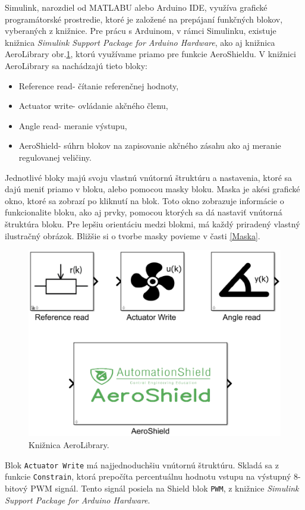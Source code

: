 Simulink, narozdiel od MATLABU alebo Arduino IDE, využíva grafické programátorské prostredie, ktoré je založené na prepájaní funkčných blokov, vyberaných z knižnice. Pre prácu s Arduinom, v rámci Simulinku, existuje knižnica \textit{Simulink Support Package for Arduino Hardware}, ako aj knižnica AeroLibrary obr.\ref{OBRAZOK 2.6.4}, ktorú využívame priamo pre funkcie AeroShieldu. V knižnici AeroLibrary sa nachádzajú tieto bloky: 
\begin{itemize}
	\item Reference read- čítanie referenčnej hodnoty, 
	\item Actuator write- ovládanie akčného členu, 
	\item Angle read- meranie výstupu, 
	\item AeroShield- súhrn blokov na zapisovanie akčného zásahu ako aj meranie regulovanej veličiny.
\end{itemize}
Jednotlivé bloky majú svoju vlastnú vnútornú štruktúru a nastavenia, ktoré sa dajú meniť priamo v bloku, alebo pomocou masky bloku. Maska je akési grafické okno, ktoré sa zobrazí po kliknutí na blok. Toto okno zobrazuje informácie o funkcionalite bloku, ako aj prvky, pomocou ktorých sa dá nastaviť vnútorná štruktúra bloku. Pre lepšiu orientáciu medzi blokmi, má každý priradený vlastný ilustračný obrázok. Bližšie si o tvorbe masky povieme v časti \ref{Maska}. 

\begin{figure}[!tbh]
	\centering
	\includegraphics[width=125mm]{obr/AeroLib.png}
	\caption{Knižnica AeroLibrary.}\label{OBRAZOK 2.6.4}
\end{figure}

Blok \verb|Actuator Write| má najjednoduchšiu vnútornú štruktúru. Skladá sa z funkcie \verb*|Constrain|, ktorá prepočíta percentuálnu hodnotu vstupu na výstupný 8-bitový PWM signál. Tento signál posiela na Shield blok \verb*|PWM|, z knižnice \textit{Simulink Support Package for Arduino Hardware}. 


